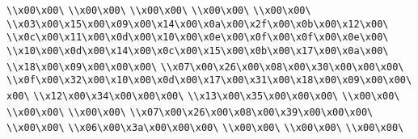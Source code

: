 \verb|\\x00\x00\|\newline
\verb|\\x00\x00\|\newline
\verb|\\x00\x00\|\newline
\verb|\\x00\x00\|\newline
\verb|\\x00\x00\|\newline
\verb|\\x03\x00\x15\x00\x09\x00\x14\x00\x0a\x00\x2f\x00\x0b\x00\x12\x00\|\newline
\verb|\\x0c\x00\x11\x00\x0d\x00\x10\x00\x0e\x00\x0f\x00\x0f\x00\x0e\x00\|\newline
\verb|\\x10\x00\x0d\x00\x14\x00\x0c\x00\x15\x00\x0b\x00\x17\x00\x0a\x00\|\newline
\verb|\\x18\x00\x09\x00\x00\x00\|\newline
\verb|\\x07\x00\x26\x00\x08\x00\x30\x00\x00\x00\|\newline
\verb|\\x0f\x00\x32\x00\x10\x00\x0d\x00\x17\x00\x31\x00\x18\x00\x09\x00\x00\x00\|\newline
\verb|\\x12\x00\x34\x00\x00\x00\|\newline
\verb|\\x13\x00\x35\x00\x00\x00\|\newline
\verb|\\x00\x00\|\newline
\verb|\\x00\x00\|\newline
\verb|\\x00\x00\|\newline
\verb|\\x07\x00\x26\x00\x08\x00\x39\x00\x00\x00\|\newline
\verb|\\x00\x00\|\newline
\verb|\\x06\x00\x3a\x00\x00\x00\|\newline
\verb|\\x00\x00\|\newline
\verb|\\x00\x00\|\newline
\verb|\\x00\x00\|\newline
